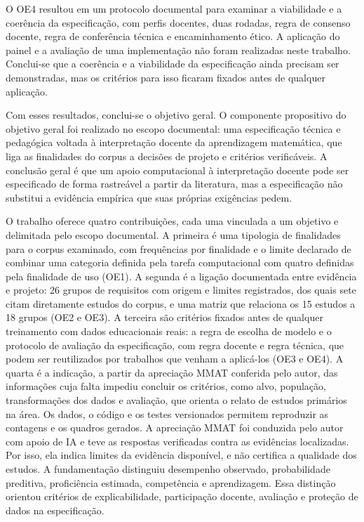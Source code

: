 O OE4 resultou em um protocolo documental para examinar a viabilidade e a coerência da especificação, com perfis docentes, duas rodadas, regra de consenso docente, regra de conferência técnica e encaminhamento ético. A aplicação do painel e a avaliação de uma implementação não foram realizadas neste trabalho. Conclui-se que a coerência e a viabilidade da especificação ainda precisam ser demonstradas, mas os critérios para isso ficaram fixados antes de qualquer aplicação.

Com esses resultados, conclui-se o objetivo geral. O componente propositivo do objetivo geral foi realizado no escopo documental: uma especificação técnica e pedagógica voltada à interpretação docente da aprendizagem matemática, que liga as finalidades do corpus a decisões de projeto e critérios verificáveis. A conclusão geral é que um apoio computacional à interpretação docente pode ser especificado de forma rastreável a partir da literatura, mas a especificação não substitui a evidência empírica que suas próprias exigências pedem.

O trabalho oferece quatro contribuições, cada uma vinculada a um objetivo e delimitada pelo escopo documental. A primeira é uma tipologia de finalidades para o corpus examinado, com frequências por finalidade e o limite declarado de combinar uma categoria definida pela tarefa computacional com quatro definidas pela finalidade de uso (OE1). A segunda é a ligação documentada entre evidência e projeto: 26 grupos de requisitos com origem e limites registrados, dos quais sete citam diretamente estudos do corpus, e uma matriz que relaciona os 15 estudos a 18 grupos (OE2 e OE3). A terceira são critérios fixados antes de qualquer treinamento com dados educacionais reais: a regra de escolha de modelo e o protocolo de avaliação da especificação, com regra docente e regra técnica, que podem ser reutilizados por trabalhos que venham a aplicá-los (OE3 e OE4). A quarta é a indicação, a partir da apreciação MMAT conferida pelo autor, das informações cuja falta impediu concluir os critérios, como alvo, população, transformações dos dados e avaliação, que orienta o relato de estudos primários na área. Os dados, o código e os testes versionados permitem reproduzir as contagens e os quadros gerados. A apreciação MMAT foi conduzida pelo autor com apoio de IA e teve as respostas verificadas contra as evidências localizadas. Por isso, ela indica limites da evidência disponível, e não certifica a qualidade dos estudos. A fundamentação distinguiu desempenho observado, probabilidade preditiva, proficiência estimada, competência e aprendizagem. Essa distinção orientou critérios de explicabilidade, participação docente, avaliação e proteção de dados na especificação.

